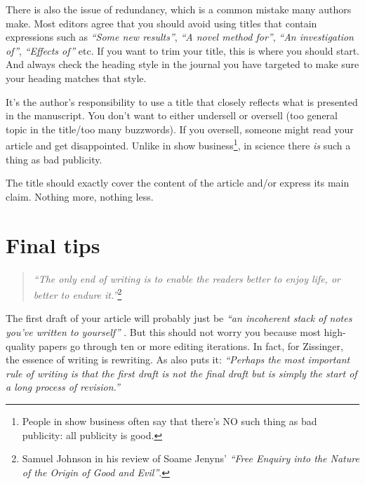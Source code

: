 \documentclass[graybox,envcountchap,sectrefs,UStrade]{svmono}
\begin{document}
There is also the issue of redundancy, which is a common mistake many authors make. Most editors agree that you should avoid using titles that contain expressions such as \emph{``Some new results''}, \emph{``A novel method for''}, \emph{``An investigation of''}, \emph{``Effects of''} etc. If you want to trim your title, this is where you should start. And always check the heading style in the journal you have targeted to make sure your heading matches that style.\par

It's the author's responsibility to use a title that closely reflects what is presented in the manuscript. You don't want to either undersell or oversell (too general topic in the title/too many buzzwords). If you oversell, someone might read your article and get disappointed. Unlike in show business\footnote{People in show business often say that there's NO such thing as bad publicity: all publicity is good.}, in science there \emph{is} such a thing as bad publicity. \par

\begin{svgraybox}
The title should exactly cover the content of the article and/or express its main claim. Nothing more, nothing less.
\end{svgraybox}\label{R:title}


\section{Final tips}

\begin{quote}
    \emph{``The only end of writing is to enable the readers better to enjoy life, or better to endure it.''}\footnote{Samuel Johnson in his review of Soame Jenyns' \emph{``Free Enquiry into the Nature of the Origin of Good and Evil''}.}
\end{quote}

The first draft of your article will probably just be \emph{``an incoherent stack of notes you've written to yourself''} \citep{Clark2003}. But this should not worry you because most high-quality papers go through ten or more editing iterations. In fact, for Zissinger, the essence of writing is rewriting. As \citet{Creedy2008research} also puts it: \emph{``Perhaps the most important rule of writing is that the first draft is not the final draft but is simply the start of a long process of revision.''} \par
\end{document}
